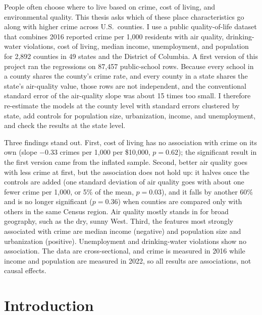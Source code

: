 \documentclass[12pt,letterpaper]{report}
\begin{document}
\noindent People often choose where to live based on crime, cost of living, and
environmental quality. This thesis asks which of these place characteristics go along
with higher crime across U.S.\ counties. I use a public quality-of-life dataset that
combines 2016 reported crime per 1,000 residents with air quality, drinking-water
violations, cost of living, median income, unemployment, and population for 2,892 counties
in 49 states and the District of Columbia. A first version of this project ran the regressions on 87,457 public-school
rows. Because every school in a county shares the county's crime rate, and every county in a
state shares the state's air-quality value, those rows are not independent, and the
conventional standard error of the air-quality slope was about 15 times too small. I
therefore re-estimate the models at the county level with standard errors clustered by
state, add controls for population size, urbanization, income, and unemployment, and check
the results at the state level.

Three findings stand out. First, cost of living has no association with crime on its own
(slope $-0.33$ crimes per 1,000 per \$10{,}000, $p=0.62$); the significant result in the
first version came from the inflated sample. Second, better air quality goes with less
crime at first, but the association does not hold up: it halves once the controls are added
(one standard deviation of air quality goes with about one fewer crime per 1,000, or 5\% of
the mean, $p=0.03$), and it falls by another 60\% and is no longer significant ($p=0.36$)
when counties are compared only with others in the same Census region. Air quality mostly
stands in for broad geography, such as the dry, sunny West. Third, the features most strongly
associated with crime are median income (negative) and population size and urbanization
(positive). Unemployment and drinking-water violations show no association. The data are
cross-sectional, and crime is measured in 2016 while income and population are measured in
2022, so all results are associations, not causal effects.
\clearpage


\chapter{Introduction}
\end{document}
